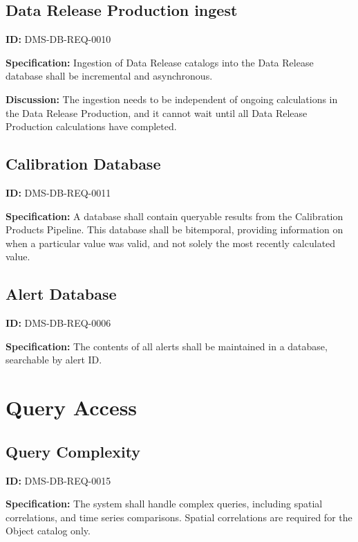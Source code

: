 \documentclass[SE,toc,lsstdraft]{lsstdoc}
\begin{document}
\subsection{Data Release Production ingest}

\label{DMS-DB-REQ-0010}
\textbf{ID:} DMS-DB-REQ-0010

\textbf{Specification:}
Ingestion of Data Release catalogs into the Data Release database shall be incremental and asynchronous.

\textbf{Discussion:}
The ingestion needs to be independent of ongoing calculations in the Data Release Production, and it cannot wait until all Data Release Production calculations have completed.

\subsection{Calibration Database}

\label{DMS-DB-REQ-0011}
\textbf{ID:} DMS-DB-REQ-0011

\textbf{Specification:}
A database shall contain queryable results from the Calibration Products Pipeline. This database shall be bitemporal, providing information on when a particular value was valid, and not solely the most recently calculated value.

\subsection{Alert Database}

\label{DMS-DB-REQ-0006}
\textbf{ID:} DMS-DB-REQ-0006

\textbf{Specification:}
The contents of all alerts shall be maintained in a database, searchable by alert ID.

\section{Query Access}

\subsection{Query Complexity}

\label{DMS-DB-REQ-0015}
\textbf{ID:} DMS-DB-REQ-0015

\textbf{Specification:}
The system shall handle complex queries, including spatial correlations, and time series comparisons. Spatial correlations are required for the Object catalog only.
\end{document}
